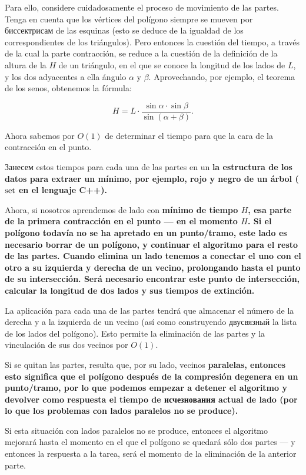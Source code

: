 Para ello, considere cuidadosamente el proceso de movimiento de las partes. Tenga en cuenta que los vértices del polígono siempre se mueven por биссектрисам de las esquinas (esto se deduce de la igualdad de los correspondientes de los triángulos). Pero entonces la cuestión del tiempo, a través de la cual la parte contracción, se reduce a la cuestión de la definición de la altura de la $H$ de un triángulo, en el que se conoce la longitud de los lados de $L$, y los dos adyacentes a ella ángulo $\alpha$ y $\beta$. Aprovechando, por ejemplo, el teorema de los senos, obtenemos la fórmula:

$$ H = L \cdot \frac{ \sin \alpha \cdot \sin \beta }{ \sin (\alpha + \beta) }. $$

Ahora sabemos por $O(1)$ de determinar el tiempo para que la cara de la contracción en el punto.

Занесем estos tiempos para cada una de las partes en un \bf{la estructura de los datos para extraer un mínimo}, por ejemplo, rojo y negro de un árbol ($\rm set$ en el lenguaje C++).

Ahora, si nosotros aprendemos de lado con \bf{mínimo de tiempo $H$}, esa parte de la primera contracción en el punto --- en el momento $H$. Si el polígono todavía no se ha apretado en un punto/tramo, este lado es necesario \bf{borrar} de un polígono, y continuar el algoritmo para el resto de las partes. Cuando elimina un lado tenemos a \bf{conectar} el uno con el otro a su izquierda y derecha de un vecino, \bf{prolongando} hasta el punto de su intersección. Será necesario encontrar este punto de intersección, calcular la longitud de dos lados y sus tiempos de extinción.

La aplicación para cada una de las partes tendrá que almacenar el número de la derecha y a la izquierda de un vecino (así como construyendo двусвязный la lista de los lados del polígono). Esto permite la eliminación de las partes y la vinculación de sus dos vecinos por $O(1)$.

Si se quitan las partes, resulta que, por su lado, vecinos \bf{paralelas}, entonces esto significa que el polígono después de la compresión degenera en un punto/tramo, por lo que podemos empezar a detener el algoritmo y devolver como respuesta el tiempo de исчезнования actual de lado (por lo que los problemas con lados paralelos no se produce).

Si esta situación con lados paralelos no se produce, entonces el algoritmo mejorará hasta el momento en el que el polígono se quedará sólo dos partes --- y entonces la respuesta a la tarea, será el momento de la eliminación de la anterior parte.

